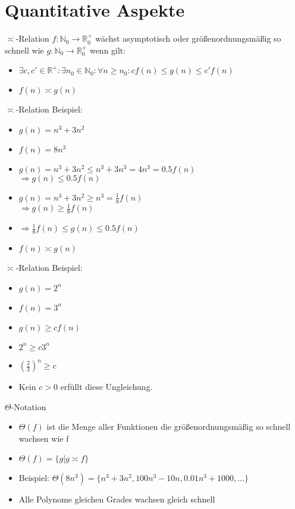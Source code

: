\section{Quantitative Aspekte}

\begin{frame}{$\asymp$-Relation}
  $f:\mathbb{N}_0 \to \mathbb{R}_0^+$ wächst asymptotisch oder größenordnungsmäßig so schnell wie $g:\mathbb{N}_0 \to \mathbb{R}_0^+$ wenn gilt:
  \begin{itemize}
    \item $\exists c,c'\in \mathbb{R}^+: \exists n_0\in \mathbb{N}_0: \forall n\geq n_0: c f(n)\leq g(n) \leq c' f(n)$
    \item $f(n)\asymp g(n)$
  \end{itemize}
\end{frame}

\begin{frame}{$\asymp$-Relation}
  Beispiel:
  \begin{itemize}
    \item $g(n)=n^3+3n^2$
    \item $f(n)=8n^3$
    \pause
    \item $g(n)=n^3+3n^2\leq n^3+3n^3=4n^3=0.5f(n)$\\
      $\Rightarrow g(n)\leq 0.5f(n)$
    \pause
    \item $g(n)=n^3+3n^2\geq n^3=\frac{1}{8}f(n)$\\
      $\Rightarrow g(n)\geq \frac{1}{8}f(n)$
    \item $\Rightarrow \frac{1}{8}f(n)\leq g(n)\leq 0.5f(n)$
    \item $f(n)\asymp g(n)$
  \end{itemize}
\end{frame}

\begin{frame}{$\asymp$-Relation}
  Beispiel:
  \begin{itemize}
    \item $g(n)=2^n$
    \item $f(n)=3^n$
    \pause
    \item $g(n)\geq cf(n)$
    \item $2^n \geq c3^n$
    \pause
    \item $(\frac{2}{3})^n\geq c$
    \pause
    \item Kein $c>0$ erfüllt diese Ungleichung.
  \end{itemize}
\end{frame}

\begin{frame}{$\Theta$-Notation}
  \begin{itemize}
    \item $\Theta(f)$ ist die Menge aller Funktionen die größenordnungsmäßig so schnell wachsen wie f
    \item $\Theta (f)=\{g|g\asymp f\}$
    \item Beispiel: $\Theta(8n^3)=\{n^3+3n^2,100n^3-10n,0.01n^3+1000, ...\}$
    \item Alle Polynome gleichen Grades wachsen gleich schnell
  \end{itemize}
\end{frame}

